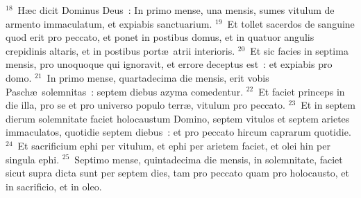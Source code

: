 ${}^{18}$~H\ae c dicit Dominus Deus~: In primo mense, una mensis, sumes vitulum de armento immaculatum, et expiabis sanctuarium.
${}^{19}$~Et tollet sacerdos de sanguine quod erit pro peccato, et ponet in postibus domus, et in quatuor angulis crepidinis altaris, et in postibus port\ae\ atrii interioris.
${}^{20}$~Et sic facies in septima mensis, pro unoquoque qui ignoravit, et errore deceptus est~: et expiabis pro domo.
${}^{21}$~In primo mense, quartadecima die mensis, erit vobis Pasch\ae\ solemnitas~: septem diebus azyma comedentur.
${}^{22}$~Et faciet princeps in die illa, pro se et pro universo populo terr\ae , vitulum pro peccato.
${}^{23}$~Et in septem dierum solemnitate faciet holocaustum Domino, septem vitulos et septem arietes immaculatos, quotidie septem diebus~: et pro peccato hircum caprarum quotidie.
${}^{24}$~Et sacrificium ephi per vitulum, et ephi per arietem faciet, et olei hin per singula ephi.
${}^{25}$~Septimo mense, quintadecima die mensis, in solemnitate, faciet sicut supra dicta sunt per septem dies, tam pro peccato quam pro holocausto, et in sacrificio, et in oleo.

